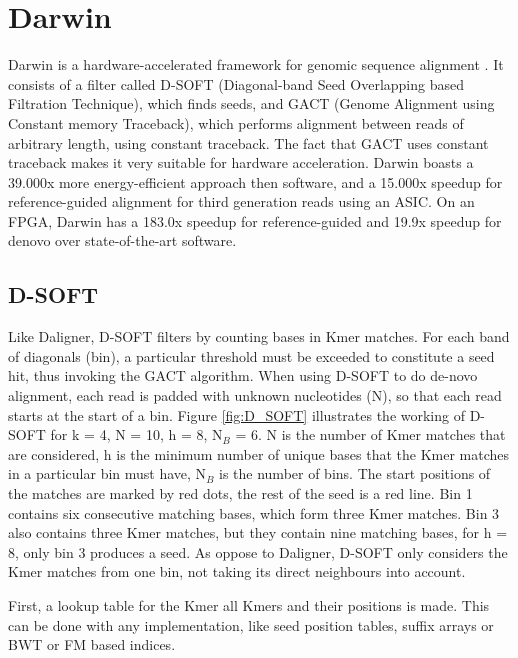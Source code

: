 \documentclass[../main/thesis.tex]{subfiles}
\begin{document}




\section{Darwin}
Darwin is a hardware-accelerated framework for genomic sequence alignment \cite{Darwin1}\cite{Darwin2}.
It consists of a filter called D-SOFT (Diagonal-band Seed Overlapping based Filtration Technique), which finds seeds, and GACT (Genome Alignment using Constant memory Traceback), which performs alignment between reads of arbitrary length, using constant traceback.
The fact that GACT uses constant traceback makes it very suitable for hardware acceleration.
Darwin boasts a 39.000x more energy-efficient approach then software, and a 15.000x speedup for reference-guided alignment for third generation reads using an ASIC.
On an FPGA, Darwin has a 183.0x speedup for reference-guided and 19.9x speedup for denovo over state-of-the-art software.


\subsection{D-SOFT}
Like Daligner, D-SOFT filters by counting bases in Kmer matches.
For each band of diagonals (bin), a particular threshold must be exceeded to constitute a seed hit, thus invoking the GACT algorithm.
When using D-SOFT to do de-novo alignment, each read is padded with unknown nucleotides (N), so that each read starts at the start of a bin.
Figure \ref{fig:D_SOFT} illustrates the working of D-SOFT for k = 4, N = 10, h = 8, N$_{B}$ = 6.
N is the number of Kmer matches that are considered, h is the minimum number of unique bases that the Kmer matches in a particular bin must have, N$_{B}$ is the number of bins.
The start positions of the matches are marked by red dots, the rest of the seed is a red line.
Bin 1 contains six consecutive matching bases, which form three Kmer matches.
Bin 3 also contains three Kmer matches, but they contain nine matching bases, for h = 8, only bin 3 produces a seed.
As oppose to Daligner, D-SOFT only considers the Kmer matches from one bin, not taking its direct neighbours into account.


First, a lookup table for the Kmer all Kmers and their positions is made.
This can be done with any implementation, like seed position tables, suffix arrays or BWT or FM based indices.
\end{document}
